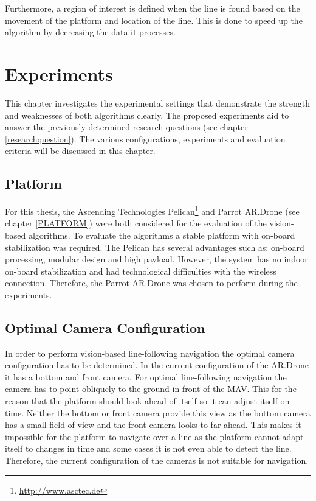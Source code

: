 \documentclass[a4paper]{article}
\begin{document}
Furthermore, a region of interest is defined when the line is found based on the movement of the platform and location of the line. This is done to speed up the algorithm by decreasing the data it processes.
\newpage
\section{Experiments}
\label{EXPERIMENTS}
This chapter investigates the experimental settings that demonstrate the strength and weaknesses of both algorithms clearly. The proposed experiments aid to answer the previously determined research questions (see chapter \ref{researchquestion}). The various configurations, experiments and evaluation criteria will be discussed in this chapter.

\subsection{Platform}
For this thesis, the Ascending Technologies Pelican\footnote{\url{http://www.asctec.de}} and Parrot AR.Drone (see chapter \ref{PLATFORM}) were both considered for the evaluation of the vision-based algorithms. To evaluate the algorithms a stable platform with on-board stabilization was required. The Pelican has several advantages such as: on-board processing, modular design and high payload. However, the system has no indoor on-board stabilization and had technological difficulties with the wireless connection. Therefore, the Parrot AR.Drone was chosen to perform during the experiments.

\subsection{Optimal Camera Configuration}
In order to perform vision-based line-following navigation the optimal camera configuration has to be determined. In the current configuration of the AR.Drone it has a bottom and front camera. For optimal line-following navigation the camera has to point obliquely to the ground in front of the MAV. This for the reason that the platform should look ahead of itself so it can adjust itself on time. Neither the bottom or front camera provide this view as the bottom camera has a small field of view and the front camera looks to far ahead. This makes it impossible for the platform to navigate over a line as the platform cannot adapt itself to changes in time and some cases it is not even able to detect the line. Therefore, the current configuration of the cameras is not suitable for 
navigation.
\end{document}
